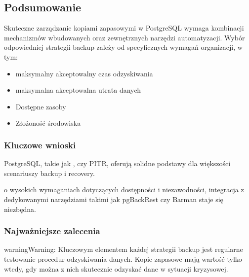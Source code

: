 \documentclass[a4paper,11pt,openany,english]{sphinxmanual}
\begin{document}
\subsection{Podsumowanie}
\label{\detokenize{rozdzial2/Kopie_zapasowe_i_odzyskiwanie_danych/kopie_zapasowe_i_odzyskiwanie_danych:podsumowanie}}
\sphinxAtStartPar
Skuteczne zarządzanie kopiami zapasowymi w PostgreSQL wymaga kombinacji mechanizmów wbudowanych oraz zewnętrznych narzędzi automatyzacji. Wybór odpowiedniej strategii backup zależy od specyficznych wymagań organizacji, w tym:
\begin{itemize}
\item {} 
\sphinxAtStartPar
{} \sphinxhyphen{} maksymalny akceptowalny czas odzyskiwania

\item {} 
\sphinxAtStartPar
{} \sphinxhyphen{} maksymalna akceptowalna utrata danych

\item {} 
\sphinxAtStartPar
Dostępne zasoby

\item {} 
\sphinxAtStartPar
Złożoność środowiska

\end{itemize}


\subsubsection{Kluczowe wnioski}
\label{\detokenize{rozdzial2/Kopie_zapasowe_i_odzyskiwanie_danych/kopie_zapasowe_i_odzyskiwanie_danych:kluczowe-wnioski}}
\sphinxAtStartPar
{} PostgreSQL, takie jak ,  czy PITR, oferują solidne podstawy dla większości scenariuszy backup i recovery.

\sphinxAtStartPar
{} o wysokich wymaganiach dotyczących dostępności i niezawodności, integracja z dedykowanymi narzędziami takimi jak pgBackRest czy Barman staje się niezbędna.


\subsubsection{Najważniejsze zalecenia}
\label{\detokenize{rozdzial2/Kopie_zapasowe_i_odzyskiwanie_danych/kopie_zapasowe_i_odzyskiwanie_danych:najwazniejsze-zalecenia}}
\begin{sphinxadmonition}{warning}{Warning:}
\sphinxAtStartPar
Kluczowym elementem każdej strategii backup jest regularne testowanie procedur odzyskiwania danych. Kopie zapasowe mają wartość tylko wtedy, gdy można z nich skutecznie odzyskać dane w sytuacji kryzysowej.
\end{sphinxadmonition}
\end{document}
